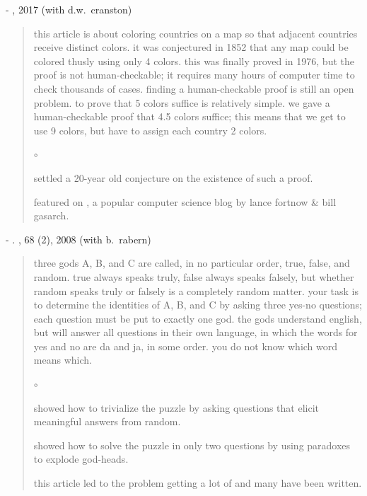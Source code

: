 \documentclass[10pt]{article}
\newcommand{\squishlist}{
   \begin{list}{$\circ$}
    { \setlength{\itemsep}{0pt}    \setlength{\parsep}{0pt}
      \setlength{\topsep}{4.5pt}     \setlength{\partopsep}{0pt}
      \setlength{\leftmargin}{2em} \setlength{\labelwidth}{1.5em}
      \setlength{\labelsep}{0.5em} } }
\newcommand{\squishend}{
    \end{list}  }
\begin{document}
  \vspace{0.05in}
{
- 
\newblock \href{https://landon.github.io/graphdata/Papers/planar%209%20halves.pdf}{\color{blue}{planar graphs are $\frac92$-colorable}}
, 2017 (with d.w.~cranston)}
\vspace{-0.15in}
\begin{quote}
\begin{minipage}{17cm}this article is about coloring countries on a map so that adjacent countries receive distinct colors. it was conjectured
in 1852 that any map could be colored thusly using only 4 colors. this was finally proved in 1976, but the proof is not human-checkable;
it requires many hours of computer time to check thousands of cases. finding a human-checkable proof is still an open problem.
to prove that 5 colors suffice is relatively simple.  we gave a human-checkable proof that 4.5 colors suffice; this means that
we get to use 9 colors, but have to assign each country 2 colors.\end{minipage}
\vspace{-0.15in}
\squishlist
	\item settled a 20-year old conjecture on the existence of such a proof.
	\item featured on 
\href{http://blog.computationalcomplexity.org/2015/10/a-human-readable-proof-that-every.html}{\color{blue}{computational complexity}}, a popular computer science blog by lance fortnow \& bill gasarch.
\squishend
\end{quote}

{
- \newblock \href{http://brianrabern.net/sshlpe.pdf}{\color{blue}{a simple solution to the hardest logic puzzle ever}}. 
, 68 (2), 2008 (with b.~rabern)}
\vspace{-0.15in}
\begin{quote}
\begin{minipage}{17cm} three gods A, B, and C are called, in no particular order, true, false, and random. 
true always speaks truly, false always speaks falsely, but whether random speaks truly or falsely is a completely random matter. 
your task is to determine the identities of A, B, and C by asking three yes-no questions; each question must be put to exactly one god. 
the gods understand english, but will answer all questions in their own language, in which the words for yes and no are da and ja, in some order. 
you do not know which word means which.\end{minipage}
\vspace{-0.15in}
	  \squishlist
		\item showed how to trivialize the puzzle by asking questions that elicit meaningful answers from random.
		\item showed how to solve the puzzle in only two questions by using paradoxes to explode god-heads.
		\item this article led to the problem getting a lot of \href{http://brianrabern.net/New_Scientist_HLPE.pdf}{\color{blue}{press}} 
		and many \href{https://scholar.google.com/scholar?oi=bibs&hl=en&cites=14941881349355280851}{\color{blue}{follow-up papers}} have been written.
      \squishend
\end{quote}
\end{document}
